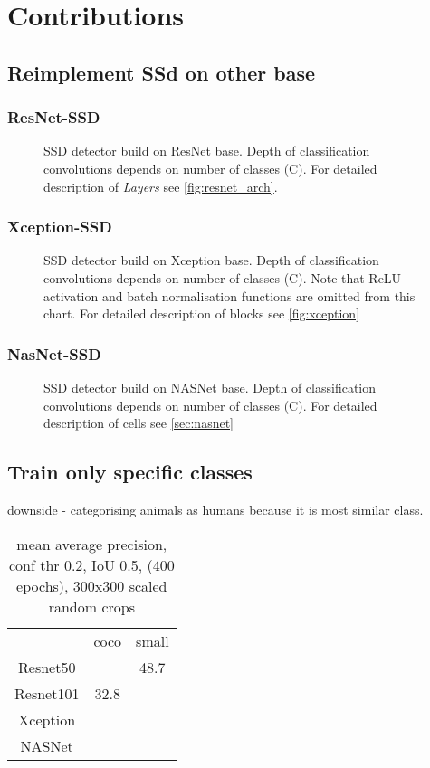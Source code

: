 \chapter{Contributions}

\section{Reimplement SSd on other base}
\subsection{ResNet-SSD}
\begin{figure}
    \label{fig:resnetSSD}
    \resnetSSD
    \caption{SSD detector build on ResNet base. Depth of classification convolutions depends on number of classes (C). For detailed description of \textit{Layers} see \cref{fig:resnet_arch}.}
\end{figure}

\subsection{Xception-SSD}


\begin{figure}
    \label{fig:xceptionSSD}
    \xceptionSSD
    \caption{SSD detector build on Xception base. Depth of classification convolutions depends on number of classes (C). Note that ReLU activation and batch normalisation functions are omitted from this chart. For detailed description of blocks see \cref{fig:xception}}
\end{figure}

\subsection{NasNet-SSD}

\begin{figure}
    \label{fig:nasnetSSD}
    \nasnetSSD
    \caption{SSD detector build on NASNet base. Depth of classification convolutions depends on number of classes (C). For detailed description of cells see \cref{sec:nasnet}}
\end{figure}


\section{Train only specific classes}
downside - categorising animals as humans because it is most similar class.
\begin{table}
    \begin{tabular}{c|c|c}
         & coco & small \\
        Resnet50 & & 48.7\\
        Resnet101 & 32.8 & \\
        Xception & & \\
        NASNet & & \\
    \end{tabular}
    \caption{mean average precision, conf thr 0.2, IoU 0.5,  (400 epochs), 300x300 scaled random crops}
    \label{tab:map}
\end{table}



